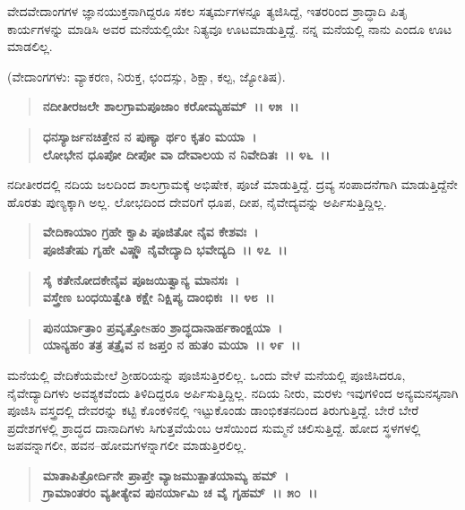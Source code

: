 ವೇದವೇದಾಂಗಗಳ ಜ್ಞಾನಯುಕ್ತನಾಗಿದ್ದರೂ ಸಕಲ ಸತ್ಕರ್ಮಗಳನ್ನೂ ತ್ಯಜಿಸಿದ್ದೆ, ಇತರರಿಂದ ಶ್ರಾದ್ಧಾದಿ ಪಿತೃ ಕಾರ್ಯಗಳನ್ನು ಮಾಡಿಸಿ ಅವರ ಮನೆಯಲ್ಲಿಯೇ ನಿತ್ಯವೂ ಊಟಮಾಡುತ್ತಿದ್ದೆ. ನನ್ನ ಮನೆಯಲ್ಲಿ ನಾನು ಎಂದೂ ಊಟ ಮಾಡಲಿಲ್ಲ.

(ವೇದಾಂಗಗಳು: ವ್ಯಾಕರಣ, ನಿರುಕ್ತ, ಛಂದಸ್ಸು, ಶಿಕ್ಷಾ, ಕಲ್ಪ, ಜ್ಯೋತಿಷ).

\begin{verse}
\textbf{ನದೀತೀರಜಲೇ ಶಾಲಗ್ರಾಮಪೂಜಾಂ ಕರೋಮ್ಯಹಮ್~।। ೪೫~।।} 
\end{verse}

\begin{verse}
\textbf{ಧನಸ್ಯಾರ್ಜನಚಿತ್ತೇನ ನ ಪುಣ್ಯಾ ರ್ಥಂ ಕೃತಂ ಮಯಾ~।}\\\textbf{ಲೋಭೇನ ಧೂಪೋ ದೀಪೋ ವಾ ದೇವಾಲಯ ನ ನಿವೇದಿತಃ~।। ೪೬~।।}
\end{verse}

ನದೀತೀರದಲ್ಲಿ ನದಿಯ ಜಲದಿಂದ ಶಾಲಗ್ರಾಮಕ್ಕೆ ಅಭಿಷೇಕ, ಪೂಜೆ ಮಾಡುತ್ತಿದ್ದೆ. ದ್ರವ್ಯ ಸಂಪಾದನೆಗಾಗಿ ಮಾಡುತ್ತಿದ್ದೆನೇ ಹೊರತು ಪುಣ್ಯಕ್ಕಾಗಿ ಅಲ್ಲ. ಲೋಭದಿಂದ ದೇವರಿಗೆ ಧೂಪ, ದೀಪ, ನೈವೇದ್ಯವನ್ನು ಅರ್ಪಿಸುತ್ತಿದ್ದಿಲ್ಲ.

\begin{verse}
\textbf{ವೇದಿಕಾಯಾಂ ಗ್ರಹೇ ಕ್ವಾಪಿ ಪೂಜಿತೋ ನೈವ ಕೇಶವಃ~।}\\\textbf{ಪೂಜಿತೇಷು ಗೃಹೇ ವಿಷ್ಣೌ ನೈವೇದ್ಯಾದಿ ಭವೇದ್ಯದಿ~।। ೪೭~।। }
\end{verse}

\begin{verse}
\textbf{ಸೈ ಕತೇನೋದಕೇನೈವ ಪೂಜಯಿತ್ವಾನ್ಯ ಮಾನಸಃ~।}\\\textbf{ವಸ್ತ್ರೇಣ ಬಂಧಯಿತ್ವೇತಿ ಕಕ್ಷೇ ನಿಕ್ಷಿಪ್ಯ ದಾಂಭಿಕಃ~।। ೪೮~।। }
\end{verse}

\begin{verse}
\textbf{ಪುನರ್ಯಾತ್ರಾಂ ಪ್ರವೃತ್ತೋsಹಂ ಶ್ರಾದ್ಧದಾನಾರ್ಹಕಾಂಕ್ಷಯಾ~।}\\\textbf{ಯಾನ್ಯಹಂ ತತ್ರ ತತ್ರೈವ ನ ಜಪ್ತಂ ನ ಹುತಂ ಮಯಾ~।। ೪೯~।।}
\end{verse}

ಮನೆಯಲ್ಲಿ ವೇದಿಕೆಯಮೇಲೆ ಶ‍್ರೀಹರಿಯನ್ನು ಪೂಜಿಸುತ್ತಿರಲಿಲ್ಲ. ಒಂದು ವೇಳೆ ಮನೆಯಲ್ಲಿ ಪೂಜಿಸಿದರೂ, ನೈವೇದ್ಯಾದಿಗಳು ಅವಶ್ಯಕವೆಂದು ತಿಳಿದಿದ್ದರೂ ಅರ್ಪಿಸುತ್ತಿದ್ದಿಲ್ಲ. ನದಿಯ ನೀರು, ಮರಳು ಇವುಗಳಿಂದ ಅನ್ಯಮನಸ್ಕನಾಗಿ ಪೂಜಿಸಿ ವಸ್ತ್ರದಲ್ಲಿ ದೇವರನ್ನು ಕಟ್ಟಿ ಕೊಂಕಳಿನಲ್ಲಿ ಇಟ್ಟುಕೊಂಡು ಡಾಂಭಿಕತನದಿಂದ ತಿರುಗುತ್ತಿದ್ದೆ. ಬೇರೆ ಬೇರೆ ಪ್ರದೇಶಗಳಲ್ಲಿ ಶ್ರಾದ್ಧದ ದಾನಾದಿಗಳು ಸಿಗುತ್ತವೆಯೆಂಬ ಆಸೆಯಿಂದ ಸುಮ್ಮನೆ ಚಲಿಸುತ್ತಿದ್ದೆ. ಹೋದ ಸ್ಥಳಗಳಲ್ಲಿ ಜಪವನ್ನಾಗಲೀ, ಹವನ–ಹೋಮಗಳನ್ನಾಗಲೀ ಮಾಡುತ್ತಿರಲಿಲ್ಲ.

\begin{verse}
\textbf{ಮಾತಾಪಿತ್ರೋರ್ದಿನೇ ಪ್ರಾಪ್ತೇ ವ್ಯಾಜಮುತ್ಪಾತಯಾಮ್ಯ ಹಮ್~।}\\\textbf{ಗ್ರಾಮಾಂತರಂ ವ್ಯತೀತ್ಯೇವ ಪುನರ್ಯಾಮಿ ಚ ವೈ ಗೃಹಮ್~।। ೫೦~।।} 
\end{verse}

